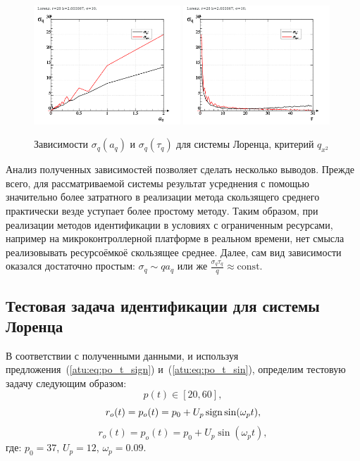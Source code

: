 \begin{figure}[h!]
\begin{center}
  \includegraphics[width=0.49\textwidth]{p/cha/lor/lor_qx2_tau-p_aq_sd.png}
  \hfill
  \includegraphics[width=0.49\textwidth]{p/cha/lor/lor_qx2_tau-p_tau_sd.png}
\end{center}
  \caption{Зависимости $\sigma_{q}(a_q)$ и $\sigma_{q}(\tau_q)$ для системы Лоренца, критерий $q_{x^2}$}
\label{atu:f:lor_qx2_tau}
\end{figure}

Анализ полученных зависимостей позволяет сделать
несколько выводов. Прежде всего, для рассматриваемой системы
результат усреднения с помощью значительно более затратного
в реализации метода скользящего среднего практически везде
уступает более простому методу. Таким образом,
при реализации методов идентификации в условиях с ограниченным ресурсами,
например на микроконтроллерной платформе в реальном времени,
нет смысла реализовывать ресурсоёмкоё скользящее среднее.
Далее, сам вид зависимости оказался достаточно простым:
$ \sigma_q \sim q a_q $ или же
$ \frac{\sigma_q \tau_q}{q} \approx \mathrm{const}$.

\subsection{Тестовая задача идентификации для системы Лоренца}

В соответствии с полученными данными, и используя
предложения~(\ref{atu:eq:po_t_sign}) и~(\ref{atu:eq:po_t_sin}),
определим тестовую задачу следующим образом:
\[
  p(t) \in [20, 60],
\]
%
\begin{equation}
  r_o(t) = p_o(t) = p_0 +  U_{p} \operatorname*{sign} \sin( \omega_{p} t ),
  \label{atu:eq:lor_po_t_sign}
\end{equation}
%
%
\begin{equation}
  r_o(t) = p_o(t) = p_0 +  U_{p} \sin( \omega_{p} t ),
  \label{atu:eq:lor_po_t_sin}
\end{equation}
%
где:
$p_0 = 37$, $U_p=12$, $\omega_p=0.09$.

